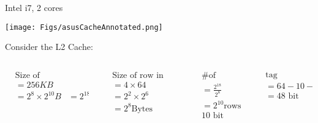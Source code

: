 \begin{frame}[fragile]
Intel i7, 2 cores

\begin{center}
    \texttt{[image: Figs/asusCacheAnnotated.png]}
\end{center}

{\scriptsize
Consider the L2 Cache:
\vspace{-0.7cm}
\begin{columns}
    \begin{column}{0.2\textwidth}
    \begin{align*}
        & \text{Size of cache} \\
        &= 256 KB  \\
        &= 2^8 \times 2^{10} B
        &= 2^{18} B
    \end{align*}
    \end{column}
    \vrule{}
        
    \begin{column}{0.2\textwidth}
    \begin{align*}
        & \text{Size of row in cache} \\
        &= 4 \times 64 \\
        &= 2^2 \times 2^6 \\
        &= 2^8 \text{Bytes}
    \end{align*}
    \end{column}
    \vrule{}

    \begin{column}{0.2\textwidth}
    \begin{align*}
        & \text{\# of indicies} \\
        &= \frac{2^{18}}{2^{8}} \\
        &= 2^{10} \text{rows} \\
        & \text{10 bit index}
    \end{align*}
    \end{column}
    \vrule{}

    \begin{column}{0.2\textwidth}
    \begin{align*}
        & \text{tag} \\
        &= 64 - 10 - 6 \\
        &= 48 \text{ bit}
    \end{align*}
    \end{column}
    

\end{columns}}
\end{frame}
